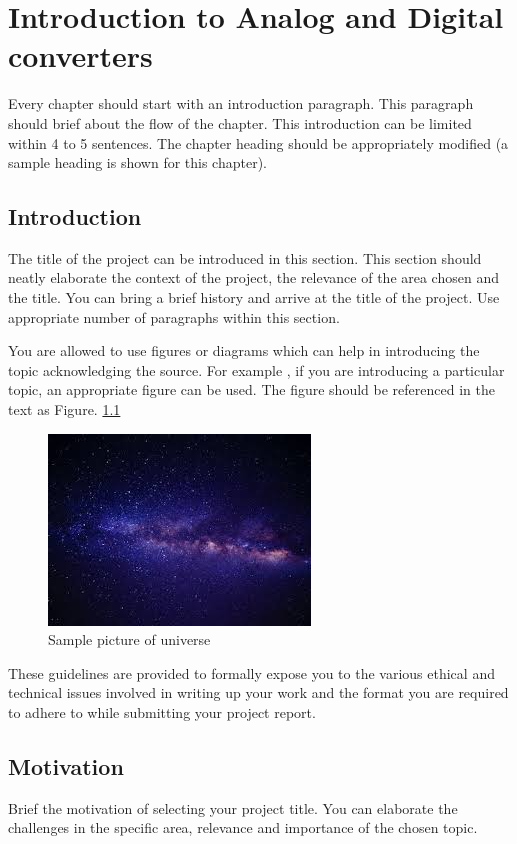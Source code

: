 \chapter{Introduction to Analog and Digital converters}
Every chapter should start with an introduction paragraph. This paragraph should brief about the flow of the chapter. This introduction can be limited within 4 to 5 sentences. The chapter heading should be appropriately modified (a sample heading is shown for this chapter).
\section[Introduction]{\textbf{Introduction}}
The title of the project can be introduced in this section. This section should neatly elaborate the context of the project, the relevance of the area chosen and the title. You can bring a brief history and arrive at the title of the project. Use appropriate number of paragraphs within this section. 

You are allowed to use figures or diagrams which can help in introducing the topic acknowledging the source. For example , if you are introducing a particular topic, an appropriate figure can be used. The figure should be referenced in the text as Figure. \ref{fig:universe} 
\begin{figure}[htb]
\centering
	\includegraphics[scale=1]{Figures/universe}	
	\caption{Sample picture of universe }
	\label{fig:universe}
\end{figure}

These guidelines are provided to formally expose you to the various ethical and technical issues involved in writing up your work and the format you are required to adhere to while submitting your project report.

\section[Motivation]{\textbf{Motivation}}

Brief the motivation of selecting your project title. You can elaborate the challenges in the specific area, relevance and importance of the chosen topic. 


